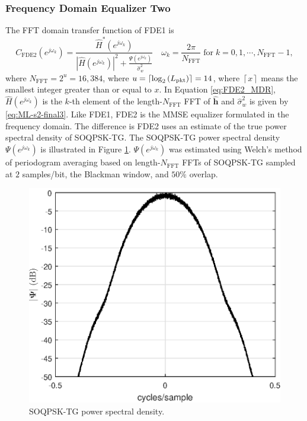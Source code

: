 \subsubsection{Frequency Domain Equalizer Two}
The FFT domain transfer function of FDE1 is \cite[eq. (12)]{williams2013linear}
\begin{equation}
C_\text{FDE2}(e^{j\omega_k}) = \frac{\hat{H}^\ast(e^{j\omega_k})}  {|\hat{H}(e^{j\omega_k})|^2  +  \frac{\Psi(e^{j\omega_k})}{\hat{\sigma}^2_w}} \quad
\omega_k = \frac{2\pi}{N_\text{FFT}} \;
\text{for} \;
k=0,1,\cdots,N_\text{FFT}-1,
\label{eq:FDE2_MDR}
\end{equation}
where $N_\text{FFT} = 2^u = 16{,}384$, where $u = {\left\lceil \log_2{\left(L_\text{pkt}\right)}  \right\rceil} = 14$,
where $\left\lceil x  \right\rceil$ means the smallest integer greater than or equal to $x$.
In Equation \eqref{eq:FDE2_MDR}, $\hat{H}(e^{j\omega_k})$ is the $k$-th element of the length-$N_\text{FFT}$ FFT of $\mathbf{\hat{h}}$ and $\hat{\sigma}^2_w$ is given by \eqref{eq:ML-s2-final3}.
Like FDE1, FDE2 is the MMSE equalizer formulated in the frequency domain.
The difference is FDE2 uses an estimate of the true power spectral density of SOQPSK-TG.
The SOQPSK-TG power spectral density $\Psi(e^{j\omega_k})$ is illustrated in Figure \ref{fig:SOQPSK_spectrum_MDR}.
$\Psi(e^{j\omega_k})$ was estimated using Welch's method of periodogram averaging based on length-$N_\text{FFT} $ FFTs of SOQPSK-TG sampled at $2$ samples/bit, the Blackman window, and $50\%$ overlap.
\begin{figure}
	\centering\includegraphics[width=5in]{figures/eq_equations/FDE2_spectrum_PSI.eps}
	\caption{SOQPSK-TG power spectral density.}
	\label{fig:SOQPSK_spectrum_MDR}
\end{figure}

